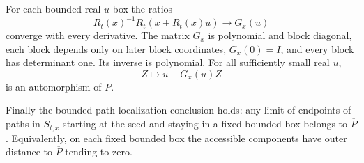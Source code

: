 \begin{theorem}
For each bounded real $u$-box the ratios
\begin{equation}\label{eq:win-ratio}
           R_t(x)^{-1}R_t(x+R_t(x)u)\longrightarrow G_x(u)
\end{equation}
converge with every derivative.  The matrix $G_x$ is polynomial and block diagonal, each block depends only on later block coordinates, $G_x(0)=I$, and every block has determinant one.  Its inverse is polynomial.  For all sufficiently small real $u$,
\begin{equation}\label{eq:win-orbit}
                           Z\longmapsto u+G_x(u)Z
\end{equation}
is an automorphism of $P$.

Finally the bounded-path localization conclusion holds: any limit of endpoints of paths in $S_{t,x}$ starting at the seed and staying in a fixed bounded box belongs to $\overline P$.  Equivalently, on each fixed bounded box the accessible components have outer distance to $\overline P$ tending to zero.
\end{theorem}


